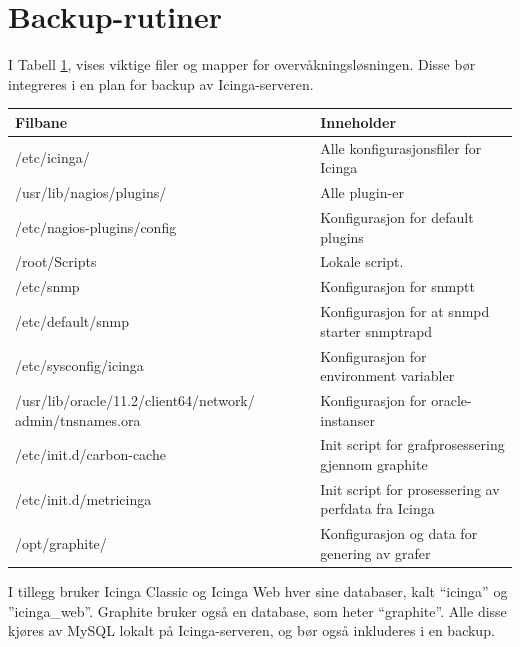 \section{Backup-rutiner}
I Tabell \ref{backup}, vises viktige filer og mapper for overvåkningsløsningen. Disse bør integreres i en plan for backup av Icinga-serveren.
\begin{table} \label{backup}
\begin{center}
\begin{tabular}{| p{8cm} | p{8cm} |}
 \hline
        \textbf{Filbane} & \textbf{Inneholder}
	\\ \hline
	/etc/icinga/ & Alle konfigurasjonsfiler for Icinga \\ \hline
	/usr/lib/nagios/plugins/ & Alle plugin-er \\ \hline
	/etc/nagios-plugins/config & Konfigurasjon for default plugins \\ \hline
	/root/Scripts & Lokale script. \\ \hline
	/etc/snmp & Konfigurasjon for snmptt \\ \hline
	/etc/default/snmp & Konfigurasjon for at snmpd starter snmptrapd \\ \hline
	/etc/sysconfig/icinga & Konfigurasjon for environment variabler \\ \hline
	/usr/lib/oracle/11.2/client64/network/
	admin/tnsnames.ora & Konfigurasjon for oracle-instanser \\ \hline
	/etc/init.d/carbon-cache & Init script for grafprosessering gjennom graphite \\ \hline
	/etc/init.d/metricinga & Init script for prosessering av perfdata fra Icinga \\ \hline
	/opt/graphite/ & Konfigurasjon og data for genering av grafer  \\ \hline
\end{tabular}
\end{center}
\end{table}
I tillegg bruker Icinga Classic og Icinga Web hver sine databaser, kalt ``icinga'' og ''icinga\_web''. Graphite bruker også en database, som heter ``graphite''. Alle disse kjøres av MySQL lokalt på Icinga-serveren, og bør også inkluderes i en backup.

